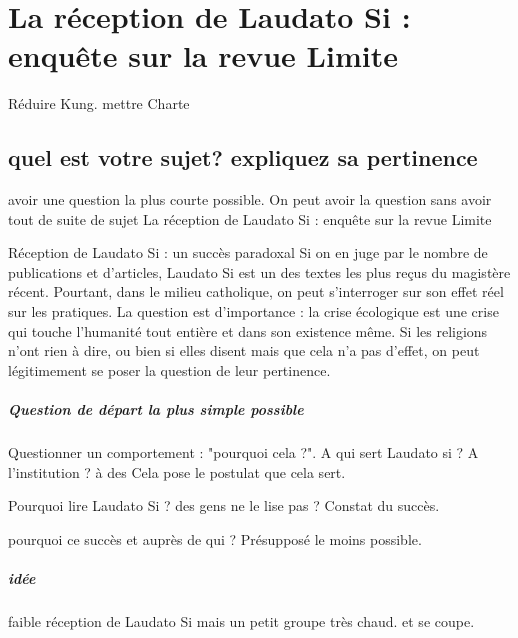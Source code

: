 \chapter{La réception de Laudato Si : enquête sur la revue Limite}

Réduire Kung. mettre Charte


\section{quel est votre sujet? expliquez sa pertinence}
  avoir une question la plus courte possible. On peut avoir la question sans avoir tout de suite de sujet
La réception de Laudato
Si : enquête sur la revue
Limite

Réception de Laudato Si : un succès paradoxal Si on en juge par le nombre de publications et d’articles, Laudato Si est un des textes les plus reçus
du magistère récent. Pourtant, dans le milieu catholique, on peut s’interroger sur son effet réel sur les pratiques. 
La question est d’importance : la crise écologique est une crise qui touche l’humanité tout entière et dans son existence
même. Si les religions n’ont rien à dire, ou bien si elles disent mais que cela n’a
pas d’effet, on peut légitimement se poser la question de leur pertinence.


\paragraph{Question de départ la plus simple possible}
Questionner un comportement : "pourquoi cela ?". 
A qui sert Laudato si ? A l'institution ?  à des 
Cela pose le postulat que cela sert.

Pourquoi lire Laudato Si ? des gens ne le lise pas ?  Constat du succès. 

pourquoi ce succès et auprès de qui ? 
Présupposé le moins possible. 


\paragraph{idée } faible réception de Laudato Si mais un petit groupe très chaud. et se coupe.

